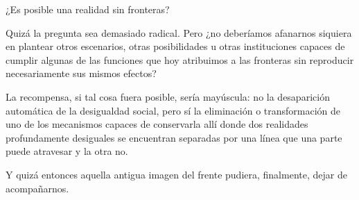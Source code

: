 \documentclass[12pt,a4paper]{article}
\begin{document}
¿Es posible una realidad sin fronteras?

Quizá la pregunta sea demasiado radical. Pero ¿no deberíamos afanarnos siquiera en plantear otros escenarios, otras posibilidades u otras instituciones capaces de cumplir algunas de las funciones que hoy atribuimos a las fronteras sin reproducir necesariamente sus mismos efectos?

La recompensa, si tal cosa fuera posible, sería mayúscula: no la desaparición automática de la desigualdad social, pero sí la eliminación o transformación de uno de los mecanismos capaces de conservarla allí donde dos realidades profundamente desiguales se encuentran separadas por una línea que una parte puede atravesar y la otra no.

Y quizá entonces aquella antigua imagen del frente pudiera, finalmente, dejar de acompañarnos.
\end{document}
